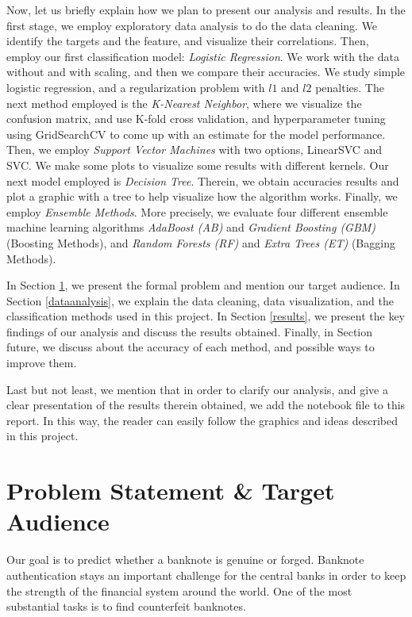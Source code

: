 \documentclass[a4paper,11pt]{amsart}
\begin{document}
Now, let us briefly explain how we plan to present our analysis and results. In the first stage, we employ exploratory data analysis to do the data cleaning. We identify the targets and the feature, and visualize their correlations. Then, employ our first classification model: \emph{Logistic Regression}. We work with the data without and with scaling, and then we compare their accuracies. 
We study simple logistic regression, and a regularization problem with $l1$ and $l2$ penalties. The next method employed is the \emph{K-Nearest Neighbor}, where we visualize the confusion matrix, and use K-fold cross validation, and hyperparameter tuning using GridSearchCV to come up with an estimate for the model performance. Then, we employ \emph{Support Vector Machines} with two options, LinearSVC and SVC. We make some plots to visualize some results with different kernels. Our next model employed is \emph{Decision Tree}. Therein, we obtain accuracies results and plot a graphic with a tree to help visualize how the algorithm works. Finally, we employ \emph{Ensemble Methods}. More precisely, we evaluate four different ensemble machine learning algorithms \emph{AdaBoost (AB)} and \emph{Gradient Boosting (GBM)}(Boosting Methods), and \emph{Random Forests (RF)} and \emph{Extra Trees (ET)} (Bagging Methods).

\medbreak

In Section \ref{problem}, we present the formal problem and mention our target audience. In Section \ref{dataanalysis}, we explain the data cleaning, data visualization, and the classification methods used in this project. In Section \ref{results}, we present the key findings of our analysis and discuss the results obtained. Finally, in Section {future}, we discuss about the accuracy of each method, and possible ways to improve them.

\medbreak

Last but not least, we mention that in order to clarify our analysis, and give a clear presentation of the results therein obtained, we add the notebook file to this report. In this way, the reader can easily follow the graphics and ideas described in this project.

\section{Problem Statement \& Target Audience}\label{problem} 

Our goal is to predict whether a banknote is genuine or forged. Banknote authentication stays an important challenge for the central banks in order to keep the strength of the financial system around the world. One of the most substantial tasks is to find counterfeit banknotes.  
\end{document}
